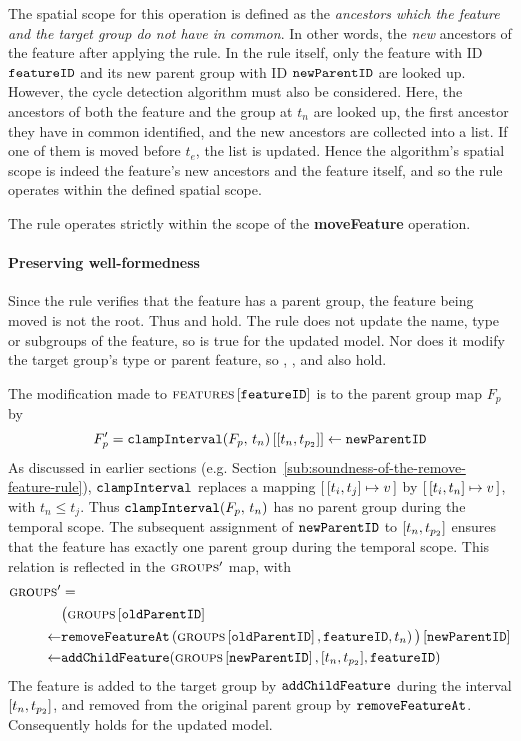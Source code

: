    The spatial scope for this operation is defined as the \emph{ancestors which the feature and the target group do not have in common}. In other words, the \emph{new} ancestors of the feature after applying the rule. In the rule itself, only the feature with ID $\texttt{featureID}$ and its new parent group with ID $\texttt{newParentID}$ are looked up. However, the cycle detection algorithm must also be considered. Here, the ancestors of both the feature and the group at $t_n$ are looked up, the first ancestor they have in common identified, and the new ancestors are collected into a list. If one of them is moved before $t_e$, the list is updated. Hence the algorithm's spatial scope is indeed the feature's new ancestors and the feature itself, and so the rule operates within the defined spatial scope.
\\

\begin{lemma}
   The  rule operates strictly within the scope of the \textbf{moveFeature} operation.
   \label{lemma:move-feature-scope}
\end{lemma}

\paragraph{Preserving well-formedness}
Since the rule verifies that the feature has a parent group, the feature being moved is not the root. Thus  and  hold. The rule does not update the name, type or subgroups of the feature, so  is true for the updated model. Nor does it modify the target group's type or parent feature, so , , and  also hold.

The modification made to $\textsc{features} \left[ \texttt{featureID} \right]$ is to the parent group map $F_p$ by 
\[
   F_p' = \lookup{\var{clampInterval}(F_p, \, t_n)}{\interval{t_n}{t_{p_2}}} \assign \var{newParentID}
\]
As discussed in earlier sections (e.g. Section~\vref{sub:soundness-of-the-remove-feature-rule}), $\texttt{clampInterval}$ replaces a mapping $\intervalmapping{t_i}{t_j}{v}$ by $\intervalmapping{t_i}{t_n}{v}$, with $t_n \leq t_j$. Thus $\texttt{clampInterval}(F_p, \, t_n)$ has no parent group during the temporal scope. The subsequent assignment of $\texttt{newParentID}$ to $\interval{t_n}{t_{p_2}}$ ensures that the feature has exactly one parent group during the temporal scope. This relation is reflected in the $\textsc{groups}{}{}'$ map, with
\begin{align*}
   \groups' &= \\
   \lookup{&\big(\lookup{\groups{}}{\var{oldParentID}} \\
   \assign & \var{removeFeatureAt}\left(\lookup{\groups{}}{\var{oldParentID}}, \var{featureID}, t_n\right)\big)}{\var{newParentID}} \\
   \assign& \var{addChildFeature}(\lookup{\groups{}}{\var{newParentID}}, \interval{t_n}{t_{p_2}}, \var{featureID})
\end{align*}
The feature is added to the target group by $\texttt{addChildFeature}$ during the interval $\interval{t_n}{t_{p_2}}$, and removed from the original parent group by $\texttt{removeFeatureAt}$. Consequently  holds for the updated model. 

